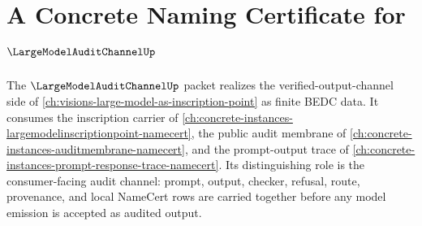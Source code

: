 \chapter{A Concrete Naming Certificate for $\LargeModelAuditChannelUp$}
\label{ch:concrete-instances-largemodelauditchannel-namecert}

The $\LargeModelAuditChannelUp$ packet realizes the verified-output-channel side of \autoref{ch:visions-large-model-as-inscription-point} as finite BEDC data. It consumes the inscription carrier of \autoref{ch:concrete-instances-largemodelinscriptionpoint-namecert}, the public audit membrane of \autoref{ch:concrete-instances-auditmembrane-namecert}, and the prompt-output trace of \autoref{ch:concrete-instances-prompt-response-trace-namecert}. Its distinguishing role is the consumer-facing audit channel: prompt, output, checker, refusal, route, provenance, and local NameCert rows are carried together before any model emission is accepted as audited output.

